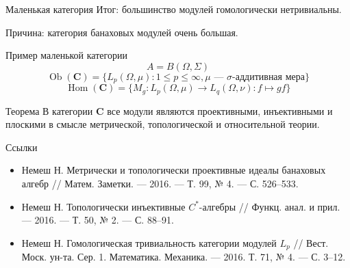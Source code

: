 \documentclass[9pt,pdf,utf8,russian]{beamer}
\begin{document}
\begin{frame}{Маленькая категория}
    \alert{Итог}: большинство модулей гомологически нетривиальны.
    \pause

    \alert{Причина}: категория банаховых модулей очень большая.
    \pause
    \begin{exampleblock}{Пример маленькой категории}
        \[
            A=B(\Omega,\Sigma)
        \]
        \pause
        \[
            \operatorname{Ob}(\mathbf{C})=\{L_p(\Omega,\mu):
            1\leq p\leq\infty, \mu \mbox{ --- }\sigma\mbox{-аддитивная мера}\}
        \]
        \pause
        \[
            \operatorname{Hom}(\mathbf{C})=\{M_g:
            L_p(\Omega,\mu)\to L_q(\Omega,\nu):f\mapsto gf\}
        \]
    \end{exampleblock}
    \pause
    \begin{alertblock}{Теорема}
        В категории $\mathbf{C}$ все модули являются проективными,
        инъективными и плоскими в смысле метрической, топологической
        и относительной теории.
    \end{alertblock}
\end{frame}


\begin{frame}{Ссылки}
    \begin{itemize}
        \item Немеш Н. Метрически и топологически проективные идеалы банаховых
              алгебр // Матем. Заметки.  --- 2016.
              --- Т. 99, № 4. --- С. 526--533.
        \item Немеш Н. Топологически инъективные $C^*$-алгебры //
              Функц. анал. и прил. --- 2016. --- Т. 50, № 2. --- С. 88--91.
        \item Немеш Н. Гомологическая тривиальность категории модулей $L_p$ //
              Вест. Моск. ун-та. Сер. 1. Математика. Механика.
              --- 2016. Т. 71, № 4. --- С. 3--12.
    \end{itemize}
\end{frame}


\end{document}
